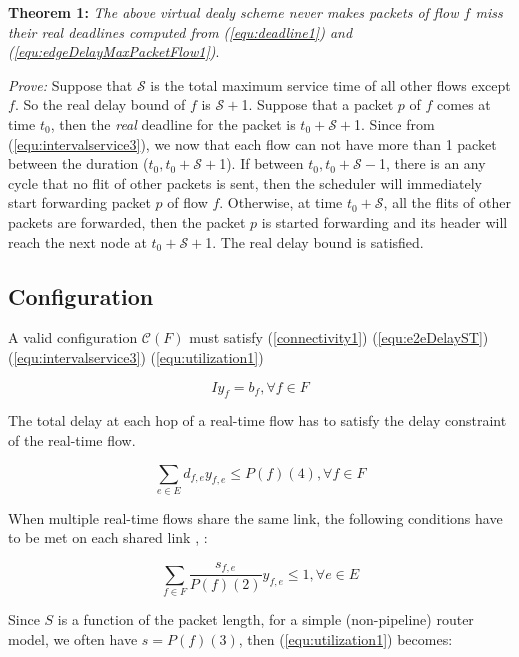 \documentclass[conference, twocolumn]{IEEEtran}
\theoremstyle{definition}
\begin{document}
{\textbf{Theorem 1:}} {\em  The above virtual dealy scheme never makes
packets of flow $f$ miss their real deadlines computed from
(\ref{equ:deadline1}) and (\ref{equ:edgeDelayMaxPacketFlow1})}.

{\em Prove:} Suppose that $\mathcal{S}$ is the total maximum service time of all
other flows except $f$. So the real delay bound of $f$ is $\mathcal{S}+$1.
Suppose that a packet $p$ of $f$ comes at time $t_0$, then the {\em real}
deadline for the packet is $t_0+\mathcal{S}+$1. Since from
(\ref{equ:intervalservice3}), we now that each flow can not have more than 1
packet between the duration ($t_0, t_0+\mathcal{S}+$1). If between $t_0,
t_0+\mathcal{S} -$1, there is an any cycle that no flit of other packets is
sent, then the scheduler will immediately start forwarding packet $p$ of flow $f$.
Otherwise, at time $t_0+\mathcal{S}$, all the flits of other packets are
forwarded, then the packet $p$ is started forwarding and its header will reach
the next node at $t_0+\mathcal{S}+$1. The real delay bound is satisfied.

\subsection{Configuration}
A valid configuration $\mathcal{C}(F)$ must satisfy (\ref{connectivity1}) 
(\ref{equ:e2eDelayST}) (\ref{equ:intervalservice3}) (\ref{equ:utilization1})

\begin{equation}\label{connectivity1} Iy_f=b_f,\forall f \in F
\end{equation}

The total delay at each hop of a real-time flow has to satisfy the delay constraint
of the real-time flow.

\begin{equation}\label{equ:e2eDelayST}
\sum_{e \in E}d_{f,e}y_{f,e} \leq P(f)(4), \forall f \in F
\end{equation}

When multiple real-time flows share the same link, the following conditions
 have to be met on each shared link \cite{Ferrari90ascheme},
 \cite{VermaJitter91}:

\begin{equation}\label{equ:utilization1}
\sum_{f \in F}\frac{s_{f,e}}{P(f)(2)}y_{f,e} \leq 1, \forall e \in E
\end{equation}

Since $S$ is a function of the packet length, for a simple (non-pipeline) router
model, we often have $s=P(f)(3)$, then (\ref{equ:utilization1}) becomes:
\end{document}
